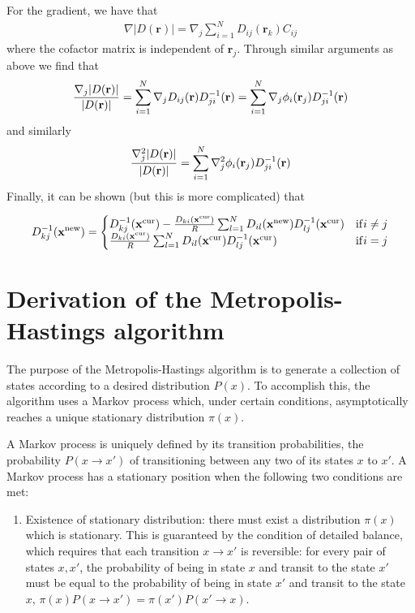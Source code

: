 \documentclass[aps,prc,twocolumn,floatfix]{revtex4}
\def\xvec{\textbf{x}}
\def\rvec{\textbf{r}}
\begin{document}
\begin{appendices}
For the gradient, we have that 
\begin{align}
 \nabla |D(\rvec)| = \nabla_j \sum_{i=1}^N D_{ij}(\rvec_k) C_{ij}
\end{align}
where the cofactor matrix is independent of $\rvec_j$. Through similar arguments as above we find that 
\begin{equation}
 {\nabla_j |D(\rvec)| \over |D(\rvec)|} = \sum_{i=1}^N \nabla_j D_{ij}(\rvec) D_{ji}^{-1}(\rvec) = \sum_{i=1}^N \nabla_j \phi_i(\rvec_j) D_{ji}^{-1}(\rvec)
\end{equation}
and similarly
\begin{equation}
 {\nabla_j^2 |D(\rvec)| \over |D(\rvec)|} = \sum_{i=1}^N \nabla_j^2 \phi_i(\rvec_j) D_{ji}^{-1}(\rvec)
\end{equation}
Finally, it can be shown (but this is more complicated) that
\begin{widetext}
\begin{equation}
 D_{kj}^{-1}(\xvec^{\rm new}) = \begin{cases}  D_{kj}^{-1}(\xvec^{\rm cur}) - {D_{ki}(\xvec^{\rm cur}) \over R}\sum_{l=1}^N D_{il}(\xvec^{\rm new})D_{lj}^{-1}(\xvec^{\rm cur}) & {\rm if }  i \ne j \\ {D_{ki}(\xvec^{\rm cur}) \over R}\sum_{l=1}^N D_{il}(\xvec^{\rm cur})D_{lj}^{-1}(\xvec^{\rm cur}) & {\rm if }  i = j \end{cases}
\end{equation}
\end{widetext}
 
 \section{Derivation of the Metropolis-Hastings algorithm}
 \label{sec:metropolis}
 The purpose of the Metropolis-Hastings algorithm is to generate a collection of states according to a desired distribution $P(x)$. To accomplish this, the algorithm uses a Markov process which, under certain conditions, asymptotically reaches a unique stationary distribution $\pi(x)$. 
 
 A Markov process is uniquely defined by its transition probabilities, the probability $P(x\rightarrow x')$ of transitioning between any two of its states $x$ to $x'$. A Markov process has a stationary position when the following two conditions are met: 
 \begin{enumerate}
  \item Existence of stationary distribution: there must exist a distribution $\pi(x)$ which is stationary. This is guaranteed by the condition of detailed balance, which requires that each transition $x \rightarrow x'$ is reversible: for every pair of states $x, x'$, the probability of being in state $x$ and transit to the state $x'$ must be equal to the probability of being in state $x'$ and transit to the state $x$, $\pi(x) P(x\rightarrow x') = \pi(x')P(x'\rightarrow x)$.
  

\end{enumerate}
\end{appendices}
\end{document}

